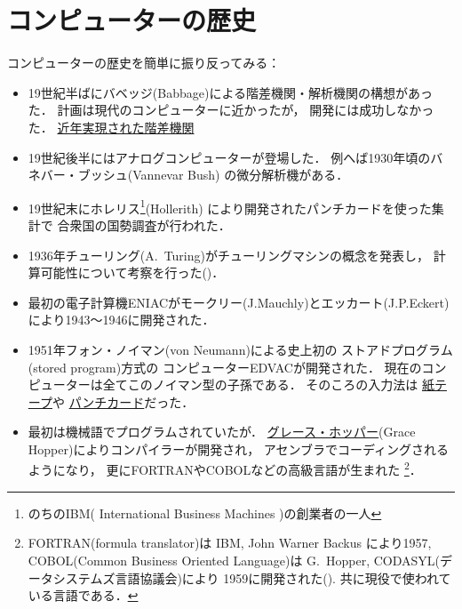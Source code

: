 \section{コンピューターの歴史}
コンピューターの歴史を簡単に振り反ってみる：
\begin{itemize}
   \item
       19世紀半ばにバベッジ(Babbage)による階差機関・解析機関の構想があった．
       計画は現代のコンピューターに近かったが，
       開発には成功しなかった．
       \href{https://www.youtube.com/watch?v=0anIyVGeWOI}
       {近年実現された階差機関}
 
   \item
       19世紀後半にはアナログコンピューターが登場した．
       例へば1930年頃のバネバー・ブッシュ(Vannevar Bush) の微分解析機がある．
   \item
      19世紀末にホレリス\footnote{のちのIBM( International Business Machines )の創業者の一人}(Hollerith)
      により開発されたパンチカードを使った集計で
      合衆国の国勢調査が行われた．
   \item
      1936年チューリング(A.~Turing)がチューリングマシンの概念を発表し，
      計算可能性について考察を行った(\cite{Turing})．

   \item
      最初の電子計算機ENIACがモークリー(J.Mauchly)とエッカート(J.P.Eckert)により1943〜1946に開発された．
      
   \item
      1951年フォン・ノイマン(von Neumann)による史上初の
      ストアドプログラム(stored program)方式の
      コンピューターEDVACが開発された．
      現在のコンピューターは全てこのノイマン型の子孫である．
      そのころの入力法は
      \href{https://www.youtube.com/shorts/DveA0EuI5qc}{紙テープ}や
      \href{https://www.youtube.com/watch?v=0065zKzeCWI}{パンチカード}だった．
   
   \item
      最初は機械語でプログラムされていたが．
      \href{https://www.youtube.com/watch?v=xdFfUmUJZ-w} 
       {グレース・ホッパー}(Grace Hopper)によりコンパイラーが開発され，
      アセンブラでコーディングされるようになり，
      更にFORTRANやCOBOLなどの高級言語が生まれた
      \footnote{FORTRAN(formula translator)は
      IBM, John Warner Backus により1957,
       COBOL(Common Business Oriented Language)は 
       G.~Hopper, CODASYL(データシステムズ言語協議会)により
       1959に開発された(\cite{W}). 共に現役で使われている言語である．}．
   

\end{itemize}
